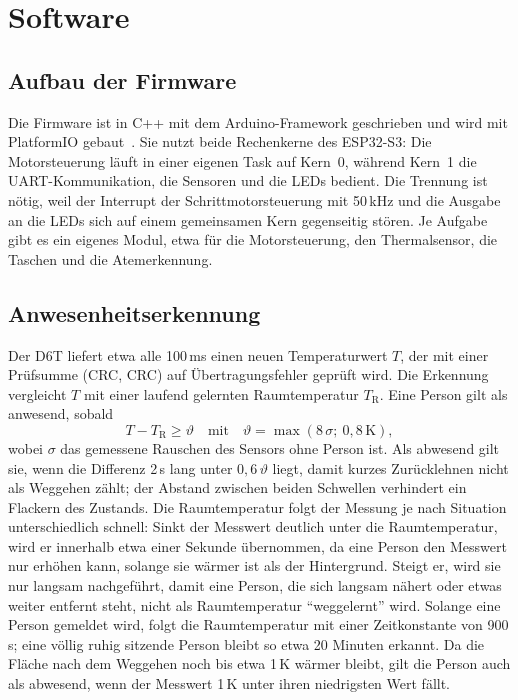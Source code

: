\section{Software}
\label{sec:software}

\subsection{Aufbau der Firmware}
\label{sec:sw_struktur}

Die Firmware ist in C++ mit dem Arduino-Framework geschrieben und wird mit PlatformIO
gebaut~\cite{jamil2026mainboard}. Sie nutzt beide Rechenkerne des ESP32-S3: Die
Motorsteuerung läuft in einer eigenen Task auf Kern~0, während Kern~1 die \ac{UART}-Kommunikation,
die Sensoren und die \acp{LED} bedient. Die Trennung ist nötig, weil der Interrupt der
Schrittmotorsteuerung mit 50\,kHz und die Ausgabe an die \acp{LED} sich auf einem gemeinsamen
Kern gegenseitig stören. Je Aufgabe gibt es ein eigenes Modul, etwa für die Motorsteuerung,
den Thermalsensor, die Taschen und die Atemerkennung.

\subsection{Anwesenheitserkennung}
\label{sec:sw_anwesenheit}

Der D6T liefert etwa alle 100\,ms einen neuen Temperaturwert $T$, der mit einer
Prüfsumme (\acl{CRC}, \acs{CRC}) auf Übertragungsfehler geprüft wird. Die Erkennung vergleicht $T$ mit einer
laufend gelernten Raumtemperatur $T_\mathrm{R}$. Eine Person gilt als anwesend, sobald
\begin{equation}
  T - T_\mathrm{R} \geq \vartheta \quad\text{mit}\quad
  \vartheta = \max\left(8\,\sigma;\ 0{,}8\,\mathrm{K}\right),
  \label{eq:anwesenheit}
\end{equation}
wobei $\sigma$ das gemessene Rauschen des Sensors ohne Person ist. Als abwesend gilt sie,
wenn die Differenz 2\,s lang unter $0{,}6\,\vartheta$ liegt, damit kurzes Zurücklehnen nicht als
Weggehen zählt; der Abstand zwischen beiden Schwellen verhindert ein Flackern des Zustands. Die Raumtemperatur folgt der Messung je nach Situation
unterschiedlich schnell: Sinkt der Messwert deutlich unter die Raumtemperatur, wird er innerhalb
etwa einer Sekunde übernommen, da eine Person den Messwert nur erhöhen kann, solange sie wärmer
ist als der Hintergrund. Steigt er, wird sie nur langsam nachgeführt, damit eine Person,
die sich langsam nähert oder etwas weiter entfernt steht, nicht als Raumtemperatur
\enquote{weggelernt} wird. Solange eine Person gemeldet wird, folgt die Raumtemperatur mit einer
Zeitkonstante von 900\,s; eine völlig ruhig sitzende Person bleibt so etwa 20 Minuten erkannt.
Da die Fläche nach dem Weggehen noch bis etwa 1\,K wärmer bleibt, gilt die Person auch als
abwesend, wenn der Messwert 1\,K unter ihren niedrigsten Wert fällt.

